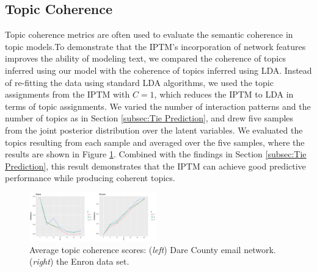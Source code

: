 \documentclass{article}
\begin{document}
\subsection{Topic Coherence}\label{subsec:Topic Coherence}
Topic coherence metrics \cite{mimno2011optimizing} are often used to evaluate the semantic coherence in topic models.To demonstrate that the IPTM's incorporation of network features improves the ability of modeling text, we compared the coherence of topics inferred using our model with the coherence of topics inferred using LDA. Instead of re-fitting the data using standard LDA algorithms, we used the topic assignments from the IPTM with $C=1$, which reduces the IPTM to LDA in terms of topic assignments. We varied the number of interaction patterns and the number of topics as in Section \ref{subsec:Tie Prediction}, and drew five samples from the joint posterior distribution over the latent variables. We evaluated the topics resulting from each sample and averaged over the five samples, where the results are shown in Figure \ref{fig:topic}. Combined with the findings in Section \ref{subsec:Tie Prediction}, this result demonstrates that the IPTM can achieve good predictive performance while producing coherent topics. 
\begin{figure}[h]
	\centering
	\includegraphics[width = 0.49\textwidth]{plots/topicplot.pdf}
	\caption{Average topic coherence scores: (\textit{left}) Dare County email network. (\textit{right}) the Enron data set.}
	\label{fig:topic}
\end{figure}
\end{document}
